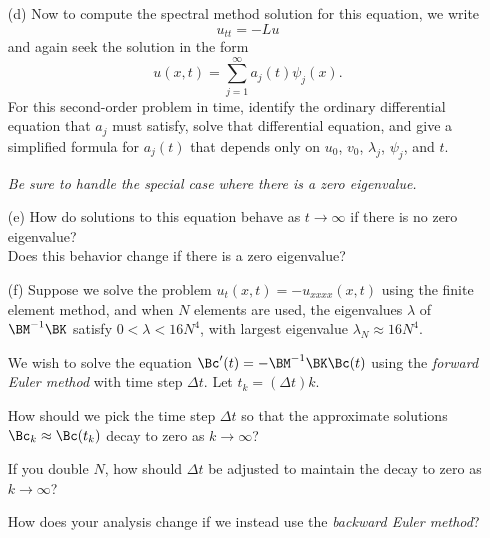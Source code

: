 \begin{enumerate}
\item[(d)] Now to compute the spectral method solution for this equation,
we write
\[ u_{tt} = - L u \] 
and again seek the solution in the form
\[ u(x,t) = \sum_{j=1}^\infty a_j(t) \psi_j(x).\]
For this second-order problem in time,
identify the ordinary differential equation that $a_j$ must satisfy,
solve that differential equation, and give a simplified formula for
$a_j(t)$ that depends only on $u_0$, $v_0$, $\lambda_j$, $\psi_j$, and $t$.

\emph{Be sure to handle the special case where there is a zero eigenvalue.}

\vspace*{1em}
\item[(e)]
How do solutions to this equation behave as $t\to\infty$ if there is no zero eigenvalue?\\
Does this behavior change if there is a zero eigenvalue?

\vspace*{1em}
\item[(f)]
  Suppose we solve the problem $u_t(x,t) = -u_{xxxx}(x,t)$
  using the finite element method, and when $N$ elements are
  used, the eigenvalues $\lambda$ of $\BM^{-1}\BK$ satisfy
  $0<\lambda < 16 N^4$, with largest eigenvalue
   $\lambda_N \approx 16 N^4$.

  We wish to solve the equation $\Bc'(t) = -\BM^{-1}\BK \Bc(t)$
  using the \emph{forward Euler method} with time step $\Delta t$.
  Let $t_k = (\Delta t)k$.  

  How should we pick the time step $\Delta t$ so that the approximate
  solutions $\Bc_k\approx \Bc(t_k)$ decay to zero as $k\to\infty$?

  If you double $N$, how should $\Delta t$ be adjusted to maintain
  the decay to zero as $k\to\infty$?

  How does your analysis change if we instead use the \emph{backward Euler method}?

\end{enumerate}

